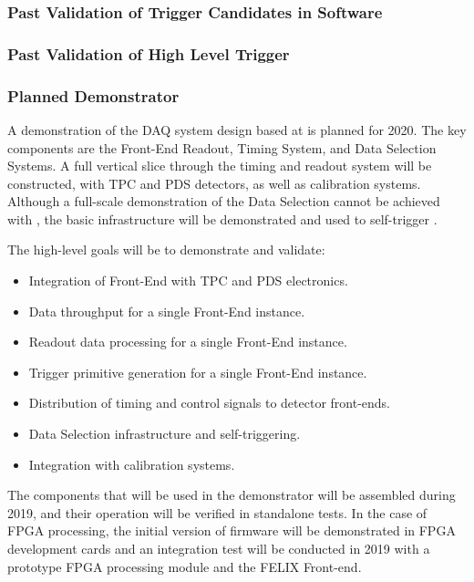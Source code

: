 \subsubsection{Past Validation of Trigger Candidates in Software}


\subsubsection{Past Validation of High Level Trigger}


\subsubsection{Planned   Demonstrator}
\label{sec:sp-daq:validation-pd-demonstrator}

A demonstration of the DAQ system design based at  is
planned for 2020. The key components are the Front-End Readout, Timing
System, and Data Selection Systems. A full vertical slice through the
timing and readout system will be constructed, with
TPC and PDS detectors, as well as calibration systems. Although a full-scale
demonstration of the Data Selection cannot be achieved with
, the basic infrastructure will be demonstrated and
used to self-trigger .

The high-level goals will be to demonstrate and validate:
\begin{itemize}
\item Integration of Front-End with TPC and PDS electronics.
\item Data throughput for a single Front-End instance.
\item Readout data processing for a single Front-End instance.
\item Trigger primitive generation for a single Front-End instance.
\item Distribution of timing and control signals to detector front-ends.
\item Data Selection infrastructure and self-triggering.
\item Integration with calibration systems.
\end{itemize}

The components that will be used in the 
demonstrator will be assembled during 2019, and their operation will
be verified in standalone tests. In the case of FPGA processing, the
initial version of firmware will be demonstrated in FPGA development
cards and an integration test will be conducted in 2019 with a
prototype FPGA processing module and the FELIX Front-end.

